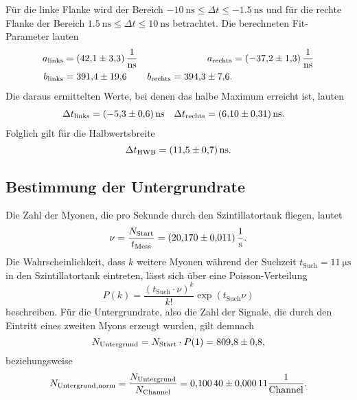 Für die linke Flanke wird der Bereich $\SI{-10}{\nano\second} \leq \Delta t \leq \SI{-1.5}{\ns}$ und für die rechte Flanke der Bereich $\SI{1.5}{\ns} \leq \Delta t \leq \SI{10}{\ns}$ betrachtet. Die berechneten Fit-Parameter lauten
\begin{align*}
  a_\mathrm{links} &= \SI{42.1 \pm 3.3}{\per\ns} & a_\mathrm{rechts} &= \SI{-37.2 \pm 1.3}{\per\ns} \\
  b_\mathrm{links} &= \num{391.4 \pm 19.6} & b_\mathrm{rechts} = \num{394.3 \pm 7.6}.
\end{align*}
Die daraus ermittelten Werte, bei denen das halbe Maximum erreicht ist, lauten
\begin{align*}
  \Delta t_\mathrm{links} &= \SI{-5.3 \pm 0.6}{\ns} & \Delta t_\mathrm{rechts} &= \SI{6.1 \pm 0.31}{\ns}.
\end{align*}
Folglich gilt für die Halbwertsbreite
\begin{equation*}
  \Delta t_\mathrm{HWB} = \SI{11.5 \pm 0.7}{\ns}.
\end{equation*}

\subsection{Bestimmung der Untergrundrate}
Die Zahl der Myonen, die pro Sekunde durch den Szintillatortank fliegen, lautet
\begin{equation*}
  \nu = \frac{N_\mathrm{Start}}{t_\mathrm{Mess}} = \SI{20.17 \pm 0.011}{\per\second}.
\end{equation*}
Die Wahrscheinlichkeit, dass $k$ weitere Myonen während der Suchzeit $t_\mathrm{Such} = \SI{11}{\micro\second}$ in den Szintillatortank eintreten, lässt sich über eine Poisson-Verteilung
\begin{equation*}
  P(k) = \frac{(t_\mathrm{Such} \cdot \nu)^k}{k!} \exp (t_\mathrm{Such} \nu)
\end{equation*}
beschreiben.
Für die Untergrundrate, also die Zahl der Signale, die durch den Eintritt eines zweiten Myons erzeugt wurden, gilt demnach
\begin{equation*}
  N_\mathrm{Untergrund} = N_\mathrm{Start} \cdot P(1) = \num{809.8 \pm 0.8},
\end{equation*}
beziehungsweise
\begin{equation*}
  N_\mathrm{Untergrund,norm} = \frac{N_\mathrm{Untergrund}}{N_\mathrm{Channel}} = \num{0.1004 \pm 0.00011} \frac{1}{\mathrm{Channel}}.
\end{equation*}

